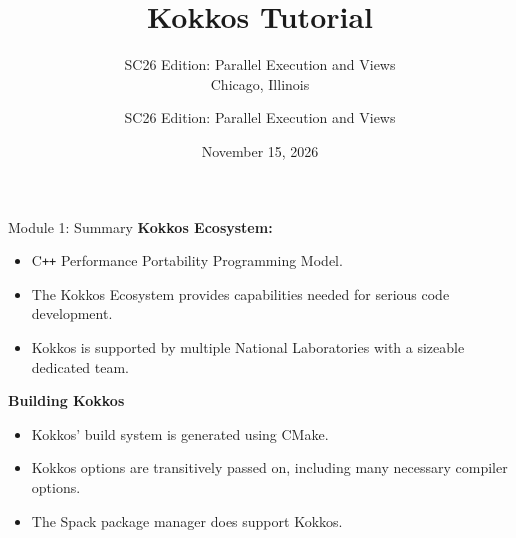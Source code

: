 
\def\sandid{SAND2020-7263 PE}

\title{Kokkos Tutorial}
\subtitle{SC26 Edition: Parallel Execution and Views\\Chicago, Illinois}

\author{SC26 Edition: Parallel Execution and Views}
\date{November 15, 2026}



\shortfalse
\mediumtrue
\fulltrue
\notoverviewtrue



% 

\begin{frame}
	\titlepage
\end{frame}













\begin{frame}{Module 1: Summary}
	\textbf{Kokkos Ecosystem:}
	\begin{itemize}
		\item C\texttt{++} Performance Portability Programming Model.
		\item The Kokkos Ecosystem provides capabilities needed for serious code development.
		\item Kokkos is supported by multiple National Laboratories with a sizeable dedicated team.
	\end{itemize}

	\textbf{Building Kokkos}
	\begin{itemize}
    \item{Kokkos' build system is generated using CMake.}
    \item{Kokkos options are transitively passed on, including many necessary compiler options.}
    \item{The Spack package manager does support Kokkos.}
	\end{itemize}
\end{frame}

